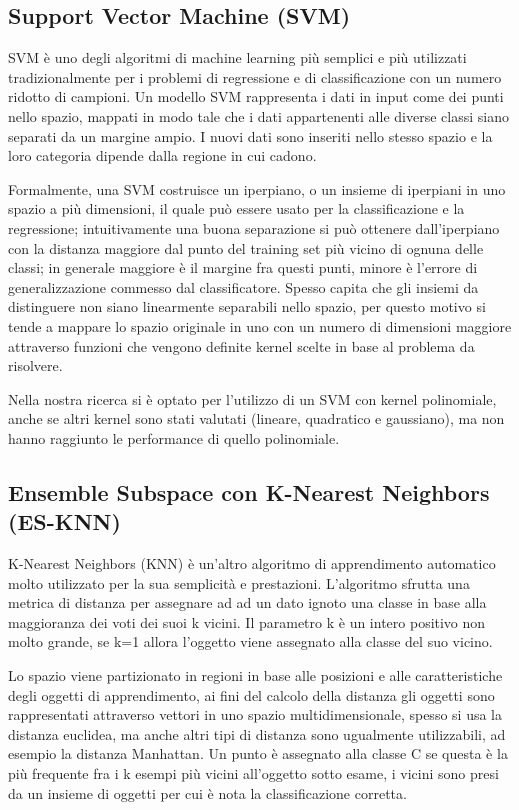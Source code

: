 \subsection{Support Vector Machine (SVM)}

SVM è uno degli algoritmi di machine learning più semplici e più utilizzati tradizionalmente per i problemi di regressione e di classificazione con un numero ridotto di campioni.
Un modello SVM rappresenta i dati in input come dei punti nello spazio, mappati in modo tale che i dati appartenenti alle diverse classi siano separati da un margine ampio. I nuovi 
dati sono inseriti nello stesso spazio e la loro categoria dipende dalla regione in cui cadono.

Formalmente, una SVM costruisce un iperpiano, o un insieme di iperpiani in uno spazio a più dimensioni, il quale può essere usato per la classificazione e la regressione; intuitivamente 
una buona separazione si può ottenere dall'iperpiano con la distanza maggiore dal punto del training set più vicino di ognuna delle classi; in generale maggiore è il margine fra questi 
punti, minore è l'errore di generalizzazione commesso dal classificatore. Spesso capita che gli insiemi da distinguere non siano linearmente separabili nello spazio, per questo motivo 
si tende a mappare lo spazio originale in uno con un numero di dimensioni maggiore attraverso funzioni che vengono definite kernel scelte in base al problema da risolvere.

Nella nostra ricerca si è optato per l'utilizzo di un SVM con kernel polinomiale, anche se altri kernel sono stati valutati (lineare, quadratico e gaussiano), ma non hanno raggiunto le performance 
di quello polinomiale.

\subsection{Ensemble Subspace con K-Nearest Neighbors (ES-KNN)}

K-Nearest Neighbors (KNN) è un'altro algoritmo di apprendimento automatico molto utilizzato per la sua semplicità e prestazioni. L'algoritmo sfrutta una metrica di distanza per assegnare ad 
ad un dato ignoto una classe in base alla maggioranza dei voti dei suoi k vicini. Il parametro k è un intero positivo non molto grande, se k=1 allora l'oggetto viene assegnato alla classe del suo vicino. 

Lo spazio viene partizionato in regioni in base alle posizioni e alle caratteristiche degli oggetti di apprendimento, ai fini del calcolo della distanza gli oggetti sono rappresentati attraverso 
vettori in uno spazio multidimensionale, spesso si usa la distanza euclidea, ma anche altri tipi di distanza sono ugualmente utilizzabili, ad esempio la distanza Manhattan. 
Un punto è assegnato alla classe C se questa è la più frequente fra i k esempi più vicini all'oggetto sotto esame, i vicini sono presi da un insieme di oggetti per cui è nota la classificazione corretta. 

